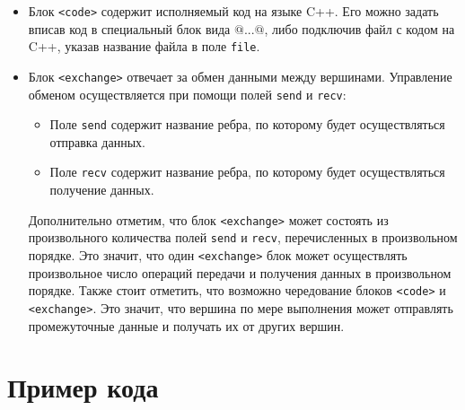 \documentclass[a4paper, 12pt]{article}
\begin{document}
	\begin{itemize}
		\item Блок \lstinline$<code>$ содержит исполняемый код на языке C++. Его можно задать вписав код в специальный блок вида $@$...$@$, либо подключив файл с кодом на C++, указав название файла в поле \lstinline$file$.
		\item Блок \lstinline$<exchange>$ отвечает за обмен данными между вершинами. Управление обменом осуществляется при помощи полей \lstinline$send$ и \lstinline$recv$:
		\begin{itemize}
			\item Поле \lstinline$send$ содержит название ребра, по которому будет осуществляться отправка данных.
			\item Поле \lstinline$recv$ содержит название ребра, по которому будет осуществляться получение данных.
		\end{itemize}
		Дополнительно отметим, что блок \lstinline$<exchange>$ может состоять из произвольного количества полей \lstinline$send$ и \lstinline$recv$, перечисленных в произвольном порядке. Это значит, что один \lstinline$<exchange>$ блок может осуществлять произвольное число операций передачи и получения данных в произвольном порядке. Также стоит отметить, что возможно чередование блоков \lstinline$<code>$ и \lstinline$<exchange>$. Это значит, что вершина по мере выполнения может отправлять промежуточные данные и получать их от других вершин.
	\end{itemize}
	
	
	\section{Пример кода}\label{sec_3}
	
\end{document}
